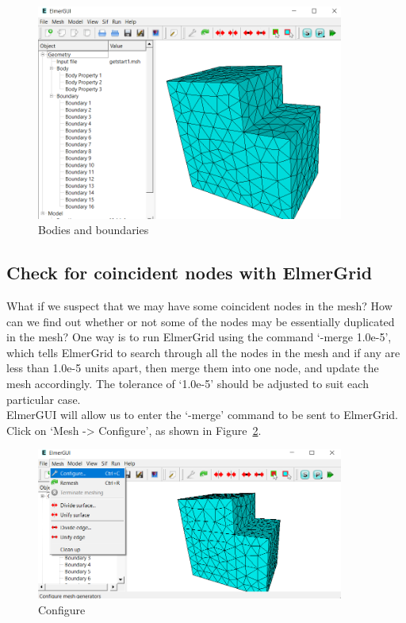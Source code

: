 \begin{figure}[H]
\centering
\includegraphics[width=0.9\textwidth]{gmsh-35}
\caption{Bodies and boundaries}\label{fg:gmsh-35}
\end{figure}

\subsection{Check for coincident nodes with ElmerGrid}

What if we suspect that we may have some coincident nodes in the mesh?  How can we find out whether or not some of the nodes may be essentially duplicated in the mesh?  One way is to run ElmerGrid using the command `-merge 1.0e-5', which tells ElmerGrid to search through all the nodes in the mesh and if any are less than 1.0e-5 units apart, then merge them into one node, and update the mesh accordingly.  The tolerance of `1.0e-5' should be adjusted to suit each particular case.\\

ElmerGUI will allow us to enter the `-merge' command to be sent to ElmerGrid.  Click on `Mesh -> Configure', as shown in Figure~\ref{fg:gmsh-36}.

\begin{figure}[H]
\centering
\includegraphics[width=0.9\textwidth]{gmsh-36}
\caption{Configure}\label{fg:gmsh-36}
\end{figure}

